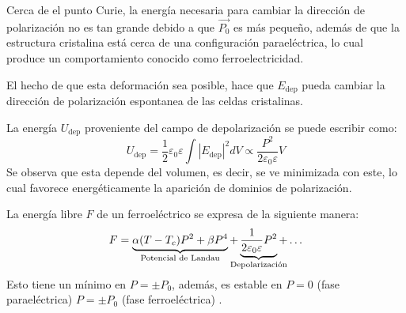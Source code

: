 \documentclass[../main.tex]{subfiles}
\begin{document}
Cerca de el punto Curie, la energía necesaria para cambiar la dirección de polarización no es tan grande debido a que $\vec{P_{0}}$ es más pequeño, además de que la estructura cristalina está cerca de una configuración paraeléctrica, lo cual produce un comportamiento conocido como ferroelectricidad.

El hecho de que esta deformación sea posible, hace que $E_\text{dep}$ pueda cambiar la dirección de polarización espontanea de las celdas cristalinas.

La energía $U_\text{dep}$ proveniente del campo de depolarización se puede escribir como:
\begin{equation}
    U_\text{dep}=\dfrac{1}{2}\varepsilon_0\varepsilon\int|E_\text{dep}|^2dV\propto\dfrac{P^2}{2\varepsilon_0\varepsilon}V
    \label{eq:label}
\end{equation}
Se observa que esta depende del volumen, es decir, se ve minimizada con este, lo cual favorece energéticamente la aparición de dominios de polarización.

La energía libre $F$ de un ferroeléctrico se expresa de la siguiente manera:
\begin{equation}
    F=\underbrace{\alpha(T-T_c)P^2+\beta P^4}_\text{\clap{Potencial de Landau}}+\underbrace{\dfrac{1}{2\varepsilon_0\varepsilon}P^2}_\text{\clap{Depolarización}}+\dots
    \label{eq:energíalibre}
\end{equation}
Esto tiene un mínimo en $P=\pm P_{0}$, además, es estable en $P=0$ (fase paraeléctrica) $P=\pm P_{0}$ (fase ferroeléctrica) \cite{Landau1984}.
\end{document}
